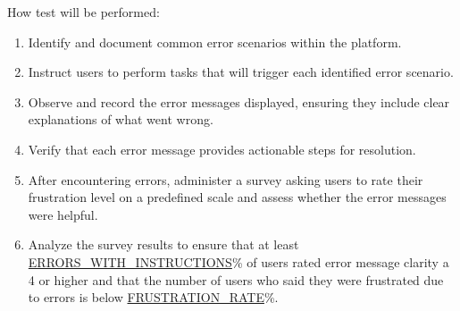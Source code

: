 \documentclass[12pt, titlepage]{article}
\begin{document}
\begin{enumerate}
How test will be performed:
\begin{enumerate}
    \item Identify and document common error scenarios within the platform.
    \item Instruct users to perform tasks that will trigger each identified error scenario.
    \item Observe and record the error messages displayed, ensuring they include clear explanations of what went wrong.
    \item Verify that each error message provides actionable steps for resolution.
    \item After encountering errors, administer a survey asking users to rate their frustration level on a predefined scale and assess whether the error messages were helpful.
    \item Analyze the survey results to ensure that at least \hyperref[ERRORS_WITH_INSTRUCTIONS]{ERRORS\_WITH\_INSTRUCTIONS}\% of users rated error message clarity a 4 or higher and that the number of users who said they were frustrated due to errors is below \hyperref[FRUSTRATION_RATE]{FRUSTRATION\_RATE}\%.
\end{enumerate}


\end{enumerate}

\end{document}
